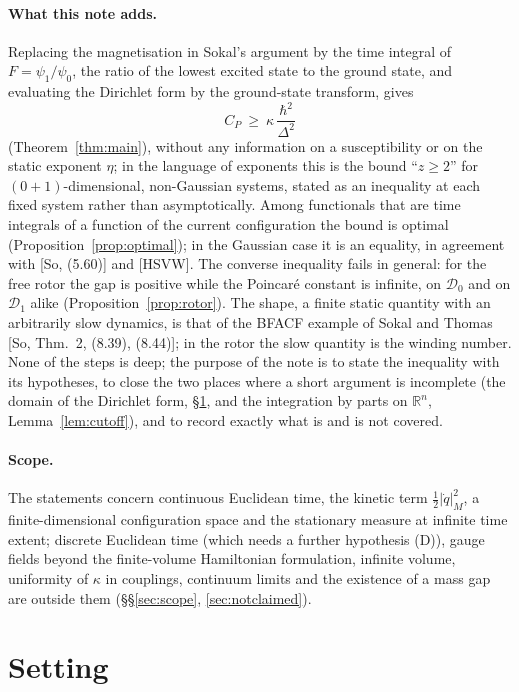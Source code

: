 \documentclass[11pt,a4paper]{article}
\theoremstyle{definition}
\theoremstyle{remark}
\newcommand{\R}{\mathbb{R}}
\newcommand{\cD}{\mathcal{D}}
\begin{document}
\paragraph{What this note adds.}
Replacing the magnetisation in Sokal's argument by the time integral of $F=\psi_1/\psi_0$, the ratio of the lowest excited state to the ground state, and evaluating the Dirichlet form by the ground-state transform, gives
\[
  C_P\ \ge\ \kappa\,\frac{\hbar^2}{\Delta^2}
\]
(Theorem~\ref{thm:main}), without any information on a susceptibility or on the static exponent $\eta$; in the language of exponents this is the bound ``$z\ge2$'' for $(0+1)$-dimensional, non-Gaussian systems, stated as an inequality at each fixed system rather than asymptotically.
Among functionals that are time integrals of a function of the current configuration the bound is optimal (Proposition~\ref{prop:optimal}); in the Gaussian case it is an equality, in agreement with [So, (5.60)] and [HSVW].
The converse inequality fails in general: for the free rotor the gap is positive while the Poincar\'e constant is infinite, on $\cD_0$ and on $\cD_1$ alike (Proposition~\ref{prop:rotor}).
The shape, a finite static quantity with an arbitrarily slow dynamics, is that of the BFACF example of Sokal and Thomas [So, Thm.~2, (8.39), (8.44)]; in the rotor the slow quantity is the winding number.
None of the steps is deep; the purpose of the note is to state the inequality with its hypotheses, to close the two places where a short argument is incomplete (the domain of the Dirichlet form, \S\ref{sec:setting}, and the integration by parts on $\R^n$, Lemma~\ref{lem:cutoff}), and to record exactly what is and is not covered.

\paragraph{Scope.}
The statements concern continuous Euclidean time, the kinetic term $\tfrac12|\dot q|_M^2$, a finite-dimensional configuration space and the stationary measure at infinite time extent; discrete Euclidean time (which needs a further hypothesis (D)), gauge fields beyond the finite-volume Hamiltonian formulation, infinite volume, uniformity of $\kappa$ in couplings, continuum limits and the existence of a mass gap are outside them (\S\S\ref{sec:scope}, \ref{sec:notclaimed}).


\section{Setting}\label{sec:setting}
\end{document}
